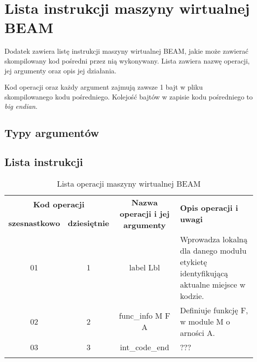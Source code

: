 \chapter{Lista instrukcji maszyny wirtualnej BEAM}
\label{cha:operacjeBeam}

Dodatek zawiera listę instrukcji maszyny wirtualnej BEAM, jakie może zawierać skompilowany kod pośredni przez nią wykonywany.
Lista zawiera nazwę operacji, jej argumenty oraz opis jej działania.

Kod operacji oraz każdy argument zajmują zawsze 1 bajt w pliku skompilowanego kodu pośredniego.
Kolejość bajtów w zapisie kodu pośredniego to \emph{big endian}.


\section{Typy argumentów}
\label{sec:opsTypes}


\section{Lista instrukcji}
\label{sec:opsOps}

\begin{longtable}{|c|c|c|p{5cm}|}
\hline

\multicolumn{2}{|c|}{\textbf{Kod operacji}} & \multirow{2}{*}{\textbf{Nazwa operacji i jej argumenty}} & \multirow{2}{*}{\textbf{Opis operacji i uwagi}} \\
\cline{1-2}
\textbf{szesnastkowo} & \textbf{dziesiętnie} & & \\
\hline
\endfirsthead

01 & 1 & label Lbl & Wprowadza lokalną dla danego modułu etykietę identyfikującą aktualne miejsce w kodzie. \\
\hline
02 & 2 & func\_info M F A & Definiuje funkcję F, w module M o arności A. \\
\hline
03 & 3 & int\_code\_end & ???  \\
\hline

\caption{Lista operacji maszyny wirtualnej BEAM}  \\
\end{longtable}



















